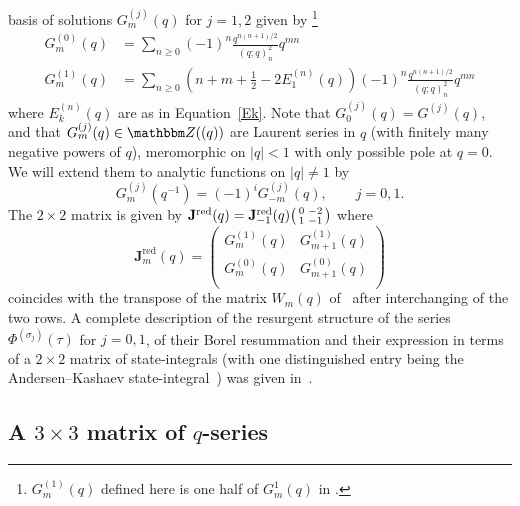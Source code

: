 \documentclass[12pt,reqno]{amsart}
\theoremstyle{definition}
\def\BZ{\mathbbm Z}
\def\s{\sigma}
\def\be{\begin{equation}}
\def\ee{\end{equation}}
\def\sma#1#2#3#4{\bigl(\smallmatrix#1&#2\\#3&#4\endsmallmatrix\bigr)}
\def\bJ{\mathbf J}
\def\RED{\mathrm{red}}
\def\sma#1#2#3#4{\bigl(\smallmatrix#1&#2\\#3&#4\endsmallmatrix\bigr)}  %
\begin{document}
basis of solutions $G^{(j)}_m(q)$ for $j=1,2$ given by 
\footnote{$G_m^{(1)}(q)$ defined here is one half of $G^1_m(q)$ in
  \cite{GGM:resurgent}.}
\be
\label{Gm01}
\begin{aligned}
G_{m}^{(0)}(q) &=
\sum_{n\geq0}(-1)^{n}\frac{q^{n(n+1)/2}}{(q;q)_{n}^{2}}q^{mn}\\
G_{m}^{(1)}(q) &=
\sum_{n\geq0}\left(n+m+\frac{1}{2}-2E_{1}^{(n)}(q)\right)(-1)^{n}
\frac{q^{n(n+1)/2}}{(q;q)_{n}^{2}}q^{mn}
\end{aligned}
\ee
where $E_{k}^{(n)}(q)$ are as in Equation~\eqref{Ek}. Note that
$G_0^{(j)}(q)=G^{(j)}(q)$, and that $G^{(j)}_m(q) \in \BZ((q))$
are Laurent series in $q$ (with finitely many negative powers of $q$), meromorphic on
$|q|<1$ with only possible pole at $q=0$. We will extend them to analytic functions on
$|q| \neq 1$ by
\begin{equation}
  G_m^{(j)}(q^{-1}) = (-1)^{i}G^{(j)}_{-m}(q),\qquad j=0,1.
  \label{eq:Gmj-cn}
\end{equation}
The $2 \times 2$ matrix is given by 
$\bJ^\RED(q) = \bJ^\RED_{-1}(q) \sma 0{-2}1{-1}$ where
\begin{equation}
\label{Jqred}
\bJ^\RED_{m}(q) =
\begin{pmatrix}
G_{m}^{(1)}(q) & G_{m+1}^{(1)}(q)\\
G_{m}^{(0)}(q) & G_{m+1}^{(0)}(q)\\
\end{pmatrix} 
\end{equation}
coincides with the transpose of the matrix
$W_m(q)$ of~\cite[Eqn.(48)]{GGM:peacock} after interchanging of the
two rows. A complete description of the resurgent structure of the
series $\Phi^{(\s_j)}(\tau)$ for $j=0,1$, of their Borel resummation
and their expression in terms of a $2 \times 2$ matrix of
state-integrals (with one distinguished entry being the
Andersen--Kashaev state-integral~\cite{AK}) was given
in~\cite{GGM:resurgent,GGM:peacock}.

\subsection{A $3 \times 3$ matrix of $q$-series}
\label{sub.41q3}
\end{document}
